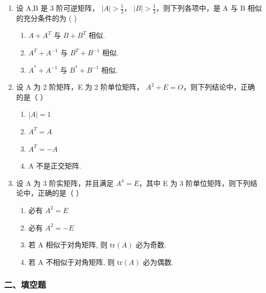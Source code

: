 \documentclass[12pt, a4paper]{ctexart}
\begin{document}
\begin{enumerate}
    \item 设 A,B 是 3 阶可逆矩阵， $ |A|>\frac{1}{2} $， $ |B|>\frac{1}{2} $，则下列各项中，是 A 与 B 相似的充分条件的为 ( \underline{\hspace{1cm}} )
    \begin{enumerate}[label=(\Alph*)]
        \item $ A + A^{T} $ 与 $ B + B^{T} $ 相似.
        \item $ A^{T} + A^{-1} $ 与 $ B^{T} + B^{-1} $ 相似.
        \item $ A^{*} + A^{-1} $ 与 $ B^{*} + B^{-1} $ 相似.
    \end{enumerate}

    \item 设 A 为 2 阶矩阵，E 为 2 阶单位矩阵， $ A^{2} + E = O $，则下列结论中，正确的是（ \underline{\hspace{1cm}} ）
    \begin{enumerate}[label=(\Alph*)]
        \item $ |A|=1 $
        \item $ A^{T}=A $
        \item $ A^{T}=-A $
        \item A 不是正交矩阵.
    \end{enumerate}

    \item 设 A 为 3 阶实矩阵，并且满足 $ A^{4}=E $，其中 E 为 3 阶单位矩阵，则下列结论中，正确的是（ \underline{\hspace{1cm}} ）
    \begin{enumerate}[label=(\Alph*)]
        \item 必有 $ A^{2}=E $
        \item 必有 $ A^{2} = -E $
        \item 若 A 相似于对角矩阵, 则 $ \mathrm{tr}(A) $ 必为奇数.
        \item 若 A 不相似于对角矩阵, 则 $ \mathrm{tr}(A) $ 必为偶数.
    \end{enumerate}
\end{enumerate}

\subsubsection*{二、填空题}
\end{document}
